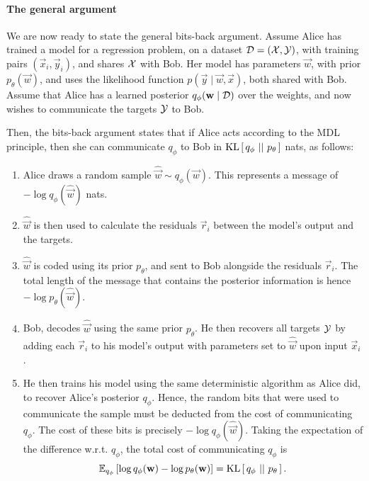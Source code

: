 \paragraph{The general argument}
We are now ready to state the general bits-back argument. Assume Alice has
trained a model for a regression problem, on a dataset $\Data = (\X, \Y)$, with
training pairs $(\vec{x}_i, \vec{y}_i)$, and shares $\X$ with Bob. Her model has
parameters $\vec{w}$, with prior $p_\theta(\vec{w})$, and uses the likelihood
function $p(\vec{y} \mid \vec{w}, \vec{x})$, both shared with Bob. Assume that
Alice has a learned posterior $q_\phi(\vec{w} \mid \Data)$ over the weights, and now
wishes to communicate the targets $\Y$ to Bob.
\par
Then, the bits-back argument states that if Alice acts according to the MDL
principle, then she can communicate $q_\phi$ to Bob in $\KL{q_\phi}{p_\theta}$
nats, as follows:
\begin{enumerate}
\item Alice draws a random sample $\hat{\vec{w}} \sim q_{\phi}(\vec{w})$. This
  represents a message of $- \log q_\phi(\hat{\vec{w}})$ nats.
\item $\hat{\vec{w}}$ is then used to calculate the residuals $\vec{r}_i$ between
  the model's output and the targets.
\item $\hat{\vec{w}}$ is coded
  using its prior $p_\theta$, and sent to Bob alongside the residuals
  $\vec{r}_i$.
  The total length of the message that contains
  the posterior information is hence $-\log p_{\theta}(\hat{\vec{w}})$.
\item Bob, decodes $\hat{\vec{w}}$ using the same prior $p_\theta$. He then
  recovers all targets $\Y$ by adding each $\vec{r}_i$ to his model's output with
  parameters set to $\hat{\vec{w}}$ upon input $\vec{x}_i$.
\item He then trains his model using the same deterministic algorithm as Alice
  did, to recover Alice's posterior $q_\phi$. Hence, the random bits that were
  used to communicate the sample must be deducted from the cost of
  communicating $q_\phi$. The cost of these bits is precisely $-\log
  q_\phi(\hat{\vec{w}})$. Taking the expectation of the difference w.r.t. $q_\phi$,
  the total cost of communicating $q_\phi$ is
  \[
    \Exp{\log q_\phi(\vec{w}) - \log p_\theta(\vec{w})}{q_\phi} = \KL{q_\phi}{p_\theta}.
  \]
\end{enumerate}


